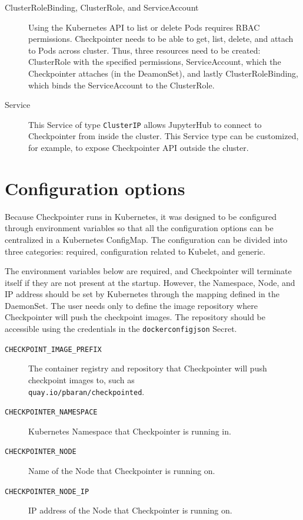 \documentclass[
  digital,     %
  oneside,     %
  nosansbold,  %
  nocolorbold, %
  lof,         %
  nolot,         %
]{fithesis4}
\begin{document}
\begin{description}
    \item[ClusterRoleBinding, ClusterRole, and ServiceAccount]
    Using the Kubernetes API to list or delete Pods requires RBAC permissions. Checkpointer needs to be able to get, list, delete, and attach to Pods across cluster. Thus, three resources need to be created: ClusterRole with the specified permissions, ServiceAccount, which the Checkpointer attaches (in the DeamonSet), and lastly ClusterRoleBinding, which binds the ServiceAccount to the ClusterRole.
    
    \item[Service] This Service of type \texttt{ClusterIP} allows JupyterHub to connect to Checkpointer from inside the cluster. This Service type can be customized, for example, to expose Checkpointer API outside the cluster.

\end{description}

\section{Configuration options}
\label{sec:checkpointer:configuration}
Because Checkpointer runs in Kubernetes, it was designed to be configured through environment variables so that all the configuration options can be centralized in a Kubernetes ConfigMap. The configuration can be divided into three categories: required, configuration related to Kubelet, and generic.

The environment variables below are required, and Checkpointer will terminate itself if they are not present at the startup. However, the Namespace, Node, and IP address should be set by Kubernetes through the mapping defined in the DaemonSet. The user needs only to define the image repository where Checkpointer will push the checkpoint images. The repository should be accessible using the credentials in the \texttt{dockerconfigjson} Secret.

\begin{description}
    \item[\texttt{CHECKPOINT\_IMAGE\_PREFIX}] The container registry and repository that Checkpointer will push checkpoint images to, such as \\ \texttt{quay.io/pbaran/checkpointed}.
    \item[\texttt{CHECKPOINTER\_NAMESPACE}] Kubernetes Namespace that Checkpointer is running in.
    \item[\texttt{CHECKPOINTER\_NODE}] Name of the Node that Checkpointer is running on.
    \item[\texttt{CHECKPOINTER\_NODE\_IP}] IP address of the Node that Checkpointer is running on.
\end{description}
\end{document}
